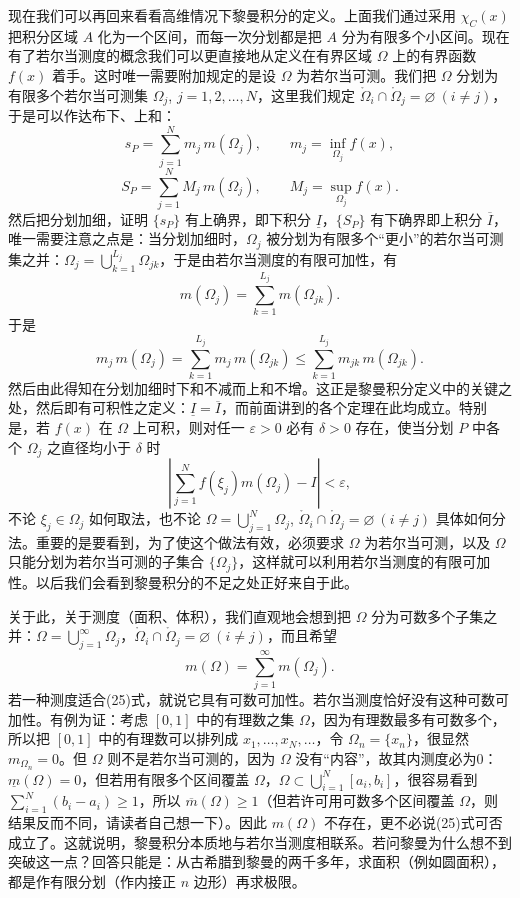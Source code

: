 现在我们可以再回来看看高维情况下黎曼积分的定义。上面我们通过采用 $\chi_C(x)$ 把积分区域 $A$ 化为一个区间，而每一次分划都是把 $A$ 分为有限多个小区间。现在有了若尔当测度的概念我们可以更直接地从定义在有界区域 $\Omega$ 上的有界函数 $f(x)$ 着手。这时唯一需要附加规定的是设 $\Omega$ 为若尔当可测。我们把 $\Omega$ 分划为有限多个若尔当可测集 $\Omega_j$, $j=1,2,\ldots,N$，这里我们规定 $\mathring\Omega_i\cap\mathring\Omega_j=\varnothing\ (i\ne j)$，于是可以作达布下、上和：
\[
 s_P=\sum_{j=1}^{N}m_j\,m(\Omega_j),\qquad m_j=\inf_{\Omega_j}f(x),
\]
\[
 S_P=\sum_{j=1}^{N}M_j\,m(\Omega_j),\qquad M_j=\sup_{\Omega_j}f(x).
\]
然后把分划加细，证明 $\{s_P\}$ 有上确界，即下积分 $\underline I$，$\{S_P\}$ 有下确界即上积分 $\overline I$，唯一需要注意之点是：当分划加细时，$\Omega_j$ 被分划为有限多个“更小”的若尔当可测集之并：$\Omega_j=\bigcup_{k=1}^{L_j}\Omega_{jk}$，于是由若尔当测度的有限可加性，有
\[
 m(\Omega_j)=\sum_{k=1}^{L_j}m(\Omega_{jk}).
\]
于是
\[
 m_j\,m(\Omega_j)=\sum_{k=1}^{L_j}m_j\,m(\Omega_{jk})
 \le\sum_{k=1}^{L_j}m_{jk}\,m(\Omega_{jk}).
\]
然后由此得知在分划加细时下和不减而上和不增。这正是黎曼积分定义中的关键之处，然后即有可积性之定义：$\underline I=\overline I$，而前面讲到的各个定理在此均成立。特别是，若 $f(x)$ 在 $\Omega$ 上可积，则对任一 $\varepsilon>0$ 必有 $\delta>0$ 存在，使当分划 $P$ 中各个 $\Omega_j$ 之直径均小于 $\delta$ 时
\[
 \left|\sum_{j=1}^{N}f(\xi_j)m(\Omega_j)-I\right|<\varepsilon,
\]
不论 $\xi_j\in\Omega_j$ 如何取法，也不论 $\Omega=\bigcup_{j=1}^{N}\Omega_j$, $\mathring\Omega_i\cap\mathring\Omega_j=\varnothing\ (i\ne j)$ 具体如何分法。重要的是要看到，为了使这个做法有效，必须要求 $\Omega$ 为若尔当可测，以及 $\Omega$ 只能分划为若尔当可测的子集合 $\{\Omega_j\}$，这样就可以利用若尔当测度的有限可加性。以后我们会看到黎曼积分的不足之处正好来自于此。

关于此，关于测度（面积、体积），我们直观地会想到把 $\Omega$ 分为可数多个子集之并：$\Omega=\bigcup_{j=1}^{\infty}\Omega_j$，$\mathring\Omega_i\cap\mathring\Omega_j=\varnothing\ (i\ne j)$，而且希望
\begin{equation}
 m(\Omega)=\sum_{j=1}^{\infty}m(\Omega_j).
 \tag{25}
\end{equation}
若一种测度适合(25)式，就说它具有可数可加性。若尔当测度恰好没有这种可数可加性。有例为证：考虑 $[0,1]$ 中的有理数之集 $\Omega$，因为有理数最多有可数多个，所以把 $[0,1]$ 中的有理数可以排列成 $x_1,\ldots,x_N,\ldots$，令 $\Omega_n=\{x_n\}$，很显然 $m_{\Omega_n}=0$。但 $\Omega$ 则不是若尔当可测的，因为 $\Omega$ 没有“内容”，故其内测度必为0：$\underline m(\Omega)=0$，但若用有限多个区间覆盖 $\Omega$，$\Omega\subset\bigcup_{i=1}^{N}[a_i,b_i]$，很容易看到 $\sum_{i=1}^{N}(b_i-a_i)\ge1$，所以 $\overline m(\Omega)\ge1$（但若许可用可数多个区间覆盖 $\Omega$，则结果反而不同，请读者自己想一下）。因此 $m(\Omega)$ 不存在，更不必说(25)式可否成立了。这就说明，黎曼积分本质地与若尔当测度相联系。若问黎曼为什么想不到突破这一点？回答只能是：从古希腊到黎曼的两千多年，求面积（例如圆面积），都是作有限分划（作内接正 $n$ 边形）再求极限。

